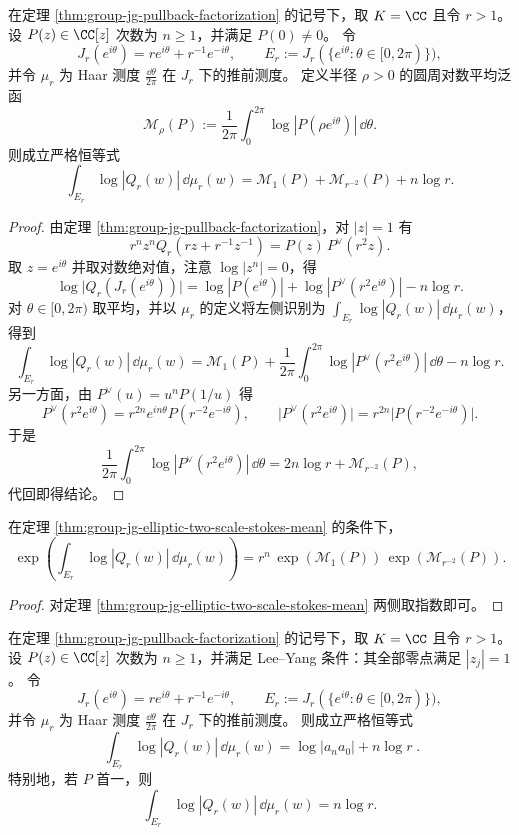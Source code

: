 \begin{theorem}\label{thm:group-jg-elliptic-two-scale-stokes-mean}
在定理 \ref{thm:group-jg-pullback-factorization} 的记号下，取 \(K=\CC\) 且令 \(r>1\)。
设 \(P(z)\in\CC[z]\) 次数为 \(n\ge 1\)，并满足 \(P(0)\neq 0\)。
令
\[
J_r(e^{i\theta})=r e^{i\theta}+r^{-1}e^{-i\theta},
\qquad
E_r:=J_r(\{e^{i\theta}:\theta\in[0,2\pi)\}),
\]
并令 \(\mu_r\) 为 Haar 测度 \(\frac{\dd\theta}{2\pi}\) 在 \(J_r\) 下的推前测度。
定义半径 \(\rho>0\) 的圆周对数平均泛函
\[
\mathcal M_\rho(P):=\frac1{2\pi}\int_{0}^{2\pi}\log|P(\rho e^{i\theta})|\,\dd\theta.
\]
则成立严格恒等式
\[
\boxed{\;
\int_{E_r}\log|Q_r(w)|\,\dd\mu_r(w)
=
\mathcal M_{1}(P)+\mathcal M_{r^{-2}}(P)+n\log r.
\;}
\]
\end{theorem}
\begin{proof}
由定理 \ref{thm:group-jg-pullback-factorization}，对 \(|z|=1\) 有
\[
r^n z^n Q_r\!\left(r z+r^{-1}z^{-1}\right)=P(z)\,P^{\vee}(r^2 z).
\]
取 \(z=e^{i\theta}\) 并取对数绝对值，注意 \(\log|z^n|=0\)，得
\[
\log\bigl|Q_r(J_r(e^{i\theta}))\bigr|
=
\log|P(e^{i\theta})|+\log|P^\vee(r^2 e^{i\theta})|-n\log r.
\]
对 \(\theta\in[0,2\pi)\) 取平均，并以 \(\mu_r\) 的定义将左侧识别为 \(\int_{E_r}\log|Q_r(w)|\,\dd\mu_r(w)\)，得到
\[
\int_{E_r}\log|Q_r(w)|\,\dd\mu_r(w)
=\mathcal M_1(P)+\frac1{2\pi}\int_{0}^{2\pi}\log|P^\vee(r^2 e^{i\theta})|\,\dd\theta-n\log r.
\]
另一方面，由 \(P^\vee(u)=u^nP(1/u)\) 得
\[
P^\vee(r^2 e^{i\theta})=r^{2n}e^{in\theta}P(r^{-2}e^{-i\theta}),
\qquad
\bigl|P^\vee(r^2 e^{i\theta})\bigr|=r^{2n}\bigl|P(r^{-2}e^{-i\theta})\bigr|.
\]
于是
\[
\frac1{2\pi}\int_{0}^{2\pi}\log|P^\vee(r^2 e^{i\theta})|\,\dd\theta
=2n\log r+\mathcal M_{r^{-2}}(P),
\]
代回即得结论。
\end{proof}

\begin{corollary}[椭圆边界对数平均的乘法分解]\label{cor:group-jg-elliptic-two-scale-mahler-multiplicative}
在定理 \ref{thm:group-jg-elliptic-two-scale-stokes-mean} 的条件下，
\[
\exp\!\left(\int_{E_r}\log|Q_r(w)|\,\dd\mu_r(w)\right)
=
r^n\,\exp(\mathcal M_1(P))\,\exp(\mathcal M_{r^{-2}}(P)).
\]
\end{corollary}
\begin{proof}
对定理 \ref{thm:group-jg-elliptic-two-scale-stokes-mean} 两侧取指数即可。
\end{proof}

\begin{theorem}\label{thm:group-jg-leyang-mahler-free-energy}
在定理 \ref{thm:group-jg-pullback-factorization} 的记号下，取 \(K=\CC\) 且令 \(r>1\)。
设 \(P(z)\in\CC[z]\) 次数为 \(n\ge 1\)，并满足 Lee--Yang 条件：其全部零点满足 \(|z_j|=1\)。
令
\[
J_r(e^{i\theta})=r e^{i\theta}+r^{-1}e^{-i\theta},
\qquad
E_r:=J_r(\{e^{i\theta}:\theta\in[0,2\pi)\}),
\]
并令 \(\mu_r\) 为 Haar 测度 \(\frac{\dd\theta}{2\pi}\) 在 \(J_r\) 下的推前测度。
则成立严格恒等式
\[
\boxed{\;
\int_{E_r}\log|Q_r(w)|\,\dd\mu_r(w)=\log|a_n a_0|+n\log r\; }.
\]
特别地，若 \(P\) 首一，则
\[
\int_{E_r}\log|Q_r(w)|\,\dd\mu_r(w)=n\log r.
\]
\end{theorem}

